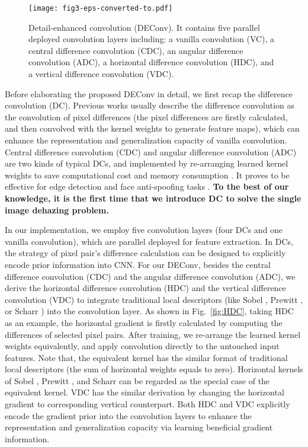 \documentclass[lettersize,journal]{IEEEtran}
\begin{document}
\begin{figure}[!t]
	\centering
	\texttt{[image: fig3-eps-converted-to.pdf]}
	\caption{Detail-enhanced convolution (DEConv). It contains five parallel deployed convolution layers including: a vanilla convolution (VC), a central difference convolution (CDC), an angular difference convolution (ADC), a horizontal difference convolution (HDC), and a vertical difference convolution (VDC).}
	\label{fig:fig3}
\end{figure}

Before elaborating the proposed DEConv in detail, we first recap the difference convolution (DC).
Previous works \cite{yu2020CVPR,yu2020TPAMI,su2021ICCV,yu2021IJCAI} usually describe the difference convolution as the convolution of pixel differences (the pixel differences are firstly calculated, and then convolved with the kernel weights to generate feature maps), which can enhance the representation and generalization capacity of vanilla convolution.
Central difference convolution (CDC) and angular difference convolution (ADC) are two kinds of typical DCs, and implemented by re-arranging learned kernel weights to save computational cost and memory consumption \cite{su2021ICCV}.
It proves to be effective for edge detection \cite{su2021ICCV} and face anti-spoofing tasks \cite{yu2020CVPR,yu2020TPAMI,yu2021IJCAI}.
\textbf{To the best of our knowledge, it is the first time that we introduce DC to solve the single image dehazing problem. }

In our implementation, we employ five convolution layers (four DCs \cite{Yu2020CVPR-CDC} and one vanilla convolution), which are parallel deployed for feature extraction.
In DCs, the strategy of pixel pair's difference calculation can be designed to explicitly encode prior information into CNN.
For our DEConv, besides the central difference convolution (CDC) and the angular difference convolution (ADC), we derive the horizontal difference convolution (HDC) and the vertical difference convolution (VDC) to integrate traditional local descriptors (like Sobel \cite{sobel19683x3}, Prewitt \cite{prewitt1970object}, or Scharr \cite{scharr2000optimal}) into the convolution layer.
As shown in Fig.~\ref{fig:HDC}, taking HDC as an example, the horizontal gradient is firstly calculated by computing the differences of selected pixel pairs. 
After training, we re-arrange the learned kernel weights equivalently, and apply convolution directly to the untouched input features.
Note that, the equivalent kernel has the similar format of traditional local descriptors (the sum of horizontal weights equals to zero).
Horizontal kernels of Sobel \cite{sobel19683x3}, Prewitt \cite{prewitt1970object}, and Scharr \cite{scharr2000optimal} can be regarded as the special case of the equivalent kernel.
VDC has the similar derivation by changing the horizontal gradient to corresponding vertical counterpart.
Both HDC and VDC explicitly encode the gradient prior into the convolution layers to enhance the representation and generalization capacity via learning beneficial gradient information.
\end{document}
